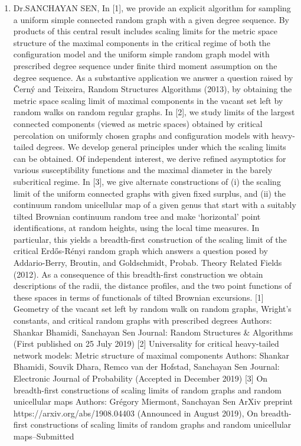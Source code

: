 \begin{enumerate}
\item Dr.SANCHAYAN SEN, In [1], we provide an explicit algorithm for sampling a uniform simple connected random graph with a given degree sequence. By products of this central result includes scaling limits for the metric space structure of the maximal components in the critical regime of both the configuration model and the uniform simple random graph model with prescribed degree sequence under finite third moment assumption on the degree sequence. As a substantive application we answer a question raised by Černý and Teixeira, Random Structures Algorithms (2013), by obtaining the metric space scaling limit of maximal components in the vacant set left by random walks on random regular graphs.  In [2], we study limits of the largest connected components (viewed as metric spaces) obtained by critical percolation on uniformly chosen graphs and configuration models with heavy-tailed degrees. We develop general principles under which the scaling limits can be obtained. Of independent interest, we derive refined asymptotics for various susceptibility functions and the maximal diameter in the barely subcritical regime.  In [3], we give alternate constructions of (i) the scaling limit of the uniform connected graphs with given fixed surplus, and (ii) the continuum random unicellular map of a given genus that start with a suitably tilted Brownian continuum random tree and make `horizontal' point identifications, at random heights, using the local time measures. In particular, this yields a breadth-first construction of the scaling limit of the critical Erdős-Rényi random graph which answers a question posed by Addario-Berry, Broutin, and Goldschmidt, Probab. Theory Related Fields (2012). As a consequence of this breadth-first construction we obtain descriptions of the radii, the distance profiles, and the two point functions of these spaces in terms of functionals of tilted Brownian excursions.    [1] Geometry of the vacant set left by random walk on random graphs, Wright's constants, and critical random graphs with prescribed degrees Authors: Shankar Bhamidi, Sanchayan Sen Journal: Random Structures & Algorithms (First published on 25 July 2019)  [2] Universality for critical heavy-tailed network models: Metric structure of maximal components Authors: Shankar Bhamidi, Souvik Dhara, Remco van der Hofstad, Sanchayan Sen Journal: Electronic Journal of Probability (Accepted in December 2019)  [3] On breadth-first constructions of scaling limits of random graphs and random unicellular maps Authors: Grégory Miermont, Sanchayan Sen ArXiv preprint https://arxiv.org/abs/1908.04403 (Announced in August 2019), On breadth-first constructions of scaling limits of random graphs and random unicellular maps--Submitted

\end{enumerate}
